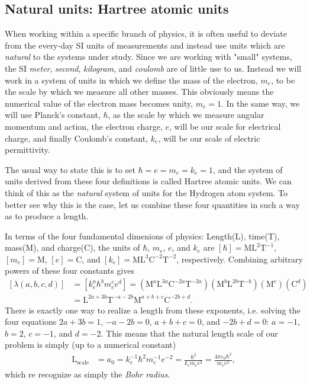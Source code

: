 \documentclass[a4paper]{article}
\newcommand{\C}{\mathbb{C}}
\newcommand{\nn}{\nonumber}
\begin{document}
\newcommand{\M}{\mathrm{M}}
\renewcommand{\L}{\mathrm{L}}
\newcommand{\T}{\mathrm{T}}
\renewcommand{\C}{\mathrm{C}}
\subsection{Natural units: Hartree atomic units}
When working within a specific branch of physics, it is often useful to deviate from the every-day SI units of measurements and instead use units which are \emph{natural} to the systems under study. Since we are working with "small" systems, the SI \emph{meter}, \emph{second}, \emph{kilogram}, and \emph{coulomb} are of little use to us. Instead we will work in a system of units in which we define the mass of the electron, $m_e$, to be the scale by which we measure all other masses. This obviously means the numerical value of the electron mass becomes unity, $m_e=1$. In the same way, we will use Planck's constant, $\hbar$, as the scale by which we measure angular momentum and action, the electron charge, $e$, will be our scale for electrical charge, and finally Coulomb's constant, $k_e$, will be our scale of electric permittivity. 

The usual way to state this is to set $\hbar=e=m_e=k_e=1$, and the system of units derived from these four definitions is called Hartree atomic units. We can think of this as the \emph{natural} system of units for the Hydrogen atom system. To better see why this is the case, let us combine these four quantities in such a way as to produce a length. 

In terms of the four fundamental dimenions of physics: Length(L), time(T), mass(M), and charge(C), the units of $\hbar$, $m_e$, $e$, and $k_e$ are $\left[\hbar\right]=\mathrm{M}\mathrm{L}^2\mathrm{T}^{-1}$, $\left[m_e\right]=\mathrm{M}$, $\left[e\right]=\mathrm{C}$, and $\left[k_e\right]=\mathrm{M}\mathrm{L}^3\mathrm{C}^{-2}\mathrm{T}^{-2}$, respectively. Combining arbitrary powers of these four constants gives 
\begin{align}
\left[\lambda(a,b,c,d)\right] &= \left[k_e^a \hbar^b m_e^c e^d\right] =  \left(\M^a \L^{3a} \C^{-2a} \T^{-2a} \right) \left(\M^b \L^{2b} \T^{-b} \right) \left( \M^c \right) \left( \C^d \right) \nn\\
&= \L^{2a+3b} \T^{-a-2b} \M^{a+b+c} \C^{-2b+d}.
\end{align}
There is exactly one way to realize a length from these exponents, i.e. solving the four equations $2a+3b=1$, $-a-2b=0$, $a+b+c=0$, and $-2b+d=0$: $a=-1$, $b=2$, $c=-1$, and $d=-2$. This means that the natural length scale of our problem is simply (up to a numerical constant)
\begin{align}
\L_\text{scale} &= a_0 = k_e^{-1} \hbar^{2} m_e^{-1} e^{-2} = \frac{\hbar^2}{k_e m_e e^2} = \frac{ 4\pi \varepsilon_0 \hbar^2 }{m_e e^2},
\end{align}
which re recognize as simply the \emph{Bohr radius}. 
\end{document}
